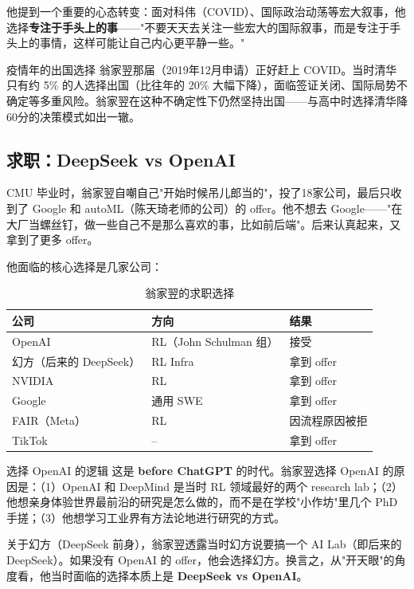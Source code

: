 \documentclass[a4paper]{article}
\begin{document}
他提到一个重要的心态转变：面对科伟（COVID）、国际政治动荡等宏大叙事，他选择\textbf{专注于手头上的事}——"不要天天去关注一些宏大的国际叙事，而是专注于手头上的事情，这样可能让自己内心更平静一些。"

\begin{knowledgebox}{疫情年的出国选择}
翁家翌那届（2019年12月申请）正好赶上 COVID。当时清华只有约 5\% 的人选择出国（比往年的 20\% 大幅下降），面临签证关闭、国际局势不确定等多重风险。翁家翌在这种不确定性下仍然坚持出国——与高中时选择清华降60分的决策模式如出一辙。
\end{knowledgebox}

\subsection{求职：DeepSeek vs OpenAI}

CMU 毕业时，翁家翌自嘲自己"开始时候吊儿郎当的"，投了18家公司，最后只收到了 Google 和 autoML（陈天琦老师的公司）的 offer。他不想去 Google——"在大厂当螺丝钉，做一些自己不是那么喜欢的事，比如前后端"。后来认真起来，又拿到了更多 offer。

他面临的核心选择是几家公司：

\begin{table}[H]
\centering
\begin{tabular}{lll}
\toprule
\textbf{公司} & \textbf{方向} & \textbf{结果} \\
\midrule
OpenAI & RL（John Schulman 组） & 接受 \\
幻方（后来的 DeepSeek） & RL Infra & 拿到 offer \\
NVIDIA & RL & 拿到 offer \\
Google & 通用 SWE & 拿到 offer \\
FAIR（Meta） & RL & 因流程原因被拒 \\
TikTok & -- & 拿到 offer \\
\bottomrule
\end{tabular}
\caption{翁家翌的求职选择}
\end{table}

\begin{importantbox}{选择 OpenAI 的逻辑}
这是 \textbf{before ChatGPT} 的时代。翁家翌选择 OpenAI 的原因是：（1）OpenAI 和 DeepMind 是当时 RL 领域最好的两个 research lab；（2）他想亲身体验世界最前沿的研究是怎么做的，而不是在学校"小作坊"里几个 PhD 手搓；（3）他想学习工业界有方法论地进行研究的方式。
\end{importantbox}

关于幻方（DeepSeek 前身），翁家翌透露当时幻方说要搞一个 AI Lab（即后来的 DeepSeek）。如果没有 OpenAI 的 offer，他会选择幻方。换言之，从"开天眼"的角度看，他当时面临的选择本质上是 \textbf{DeepSeek vs OpenAI}。
\end{document}
